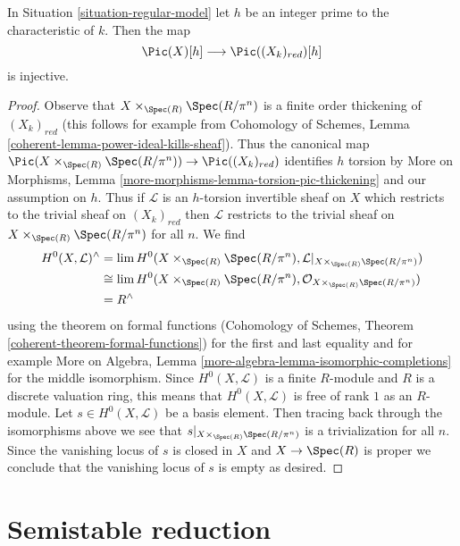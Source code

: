 \begin{lemma}
\label{lemma-torsion-embeds}
In Situation \ref{situation-regular-model} let $h$ be an integer
prime to the characteristic of $k$. Then the map
$$
\Pic(X)[h] \longrightarrow \Pic((X_k)_{red})[h]
$$
is injective.
\end{lemma}

\begin{proof}
Observe that $X \times_{\Spec(R)} \Spec(R/\pi^n)$ is a finite
order thickening of $(X_k)_{red}$ (this follows for example from
Cohomology of Schemes, Lemma \ref{coherent-lemma-power-ideal-kills-sheaf}).
Thus the canonical map
$\Pic(X \times_{\Spec(R)} \Spec(R/\pi^n)) \to \Pic((X_k)_{red})$
identifies $h$ torsion by
More on Morphisms, Lemma \ref{more-morphisms-lemma-torsion-pic-thickening}
and our assumption on $h$.
Thus if $\mathcal{L}$ is an $h$-torsion invertible sheaf on $X$
which restricts to the trivial sheaf on $(X_k)_{red}$ then
$\mathcal{L}$ restricts to the trivial sheaf on
$X \times_{\Spec(R)} \Spec(R/\pi^n)$ for all $n$.
We find
\begin{align*}
H^0(X, \mathcal{L})^\wedge
& =
\lim H^0(X \times_{\Spec(R)} \Spec(R/\pi^n),
\mathcal{L}|_{X \times_{\Spec(R)} \Spec(R/\pi^n)}) \\
& \cong
\lim H^0(X \times_{\Spec(R)} \Spec(R/\pi^n),
\mathcal{O}_{X \times_{\Spec(R)} \Spec(R/\pi^n)}) \\
& =
R^\wedge
\end{align*}
using the theorem on formal functions
(Cohomology of Schemes, Theorem \ref{coherent-theorem-formal-functions})
for the first and last equality and for example
More on Algebra, Lemma \ref{more-algebra-lemma-isomorphic-completions}
for the middle isomorphism. Since $H^0(X, \mathcal{L})$ is a finite
$R$-module and $R$ is a discrete valuation ring, this means that
$H^0(X, \mathcal{L})$ is free of rank $1$ as an $R$-module.
Let $s \in H^0(X, \mathcal{L})$ be a basis element.
Then tracing back through the isomorphisms above we see
that $s|_{X \times_{\Spec(R)} \Spec(R/\pi^n)}$ is a trivialization
for all $n$. Since the vanishing locus of $s$ is closed in $X$
and $X \to \Spec(R)$ is proper we conclude that the vanishing
locus of $s$ is empty as desired.
\end{proof}






\section{Semistable reduction}
\label{section-semistable-reduction}

